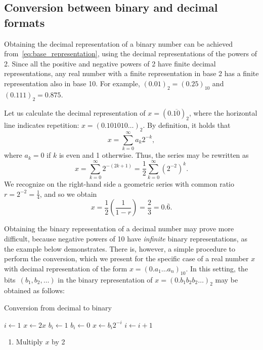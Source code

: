 \subsection*{Conversion between binary and decimal formats}%
Obtaining the decimal representation of a binary number can be achieved from~\eqref{eq:base_representation},
using the decimal representations of the powers of 2.
Since all the positive and negative powers of 2 have finite decimal representations,
any real number with a finite representation in base 2 has a finite representation also in base 10.
For example, $(0.01)_2 = (0.25)_{10}$ and $(0.111)_2 = 0.875$.
\begin{example}
    Let us calculate the decimal representation of $x = (0.\overline{10})_2$,
    where the horizontal line indicates repetition: $x = (0.101010\dots)_2$.
    By definition, it holds that
    \[
        x = \sum_{k=0}^{\infty} a_k 2^{-k},
    \]
    where $a_k = 0$ if $k$ is even and 1 otherwise.
    Thus, the series may be rewritten as
    \[
        x = \sum_{k=0}^{\infty} 2^{-(2k+1)} = \frac{1}{2} \sum_{k=0}^{\infty} (2^{-2})^k.
    \]
    We recognize on the right-hand side a geometric series with common ratio $r = 2^{-2} = \frac{1}{4}$,
    and so we obtain
    \[
        x = \frac{1}{2} \left( \frac{1}{1-r} \right) = \frac{2}{3} = 0.\overline 6.
    \]
\end{example}

Obtaining the binary representation of a decimal number may prove more difficult,
because negative powers of 10 have \emph{infinite} binary representations,
as the example below demonstrates.
There is, however, a simple procedure to perform the conversion,
which we present for the specific case of a real number $x$ with decimal representation of the form $x = (0.a_1\dots a_n)_{10}$.
In this setting,
the bits~$(b_1, b_2, \dots)$ in the binary representation of $x = (0.b_1b_2b_2 \dots)_2$ may be obtained as follows:
\begin{algorithm}
\caption{Conversion from decimal to binary}
\begin{algorithmic}
\State $i \gets 1$
    \State $x \gets 2x$
        \State $b_i \gets 1$
    \Else
        \State $b_i \gets 0$
    \EndIf
    \State $x \gets b_i 2^{-i}$
    \State $i \gets i+1$
\EndWhile
\end{algorithmic}
\end{algorithm}
\begin{enumerate}
    \item Multiply $x$ by 2
\end{enumerate}

